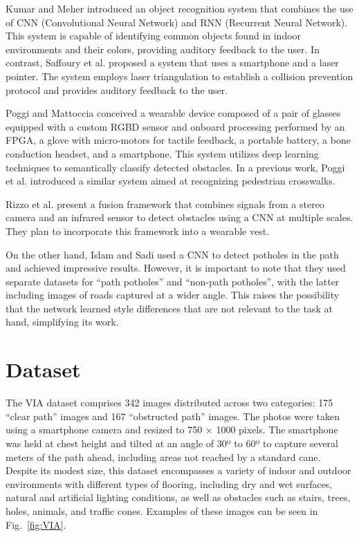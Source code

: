 \documentclass[final,5p,times,twocolumn]{elsarticle}
\begin{document}
Kumar and Meher \cite{kumar2015} introduced an object recognition system that combines the use of CNN (Convolutional Neural Network) and RNN (Recurrent Neural Network). This system is capable of identifying common objects found in indoor environments and their colors, providing auditory feedback to the user. In contrast, Saffoury et al. \cite{saffoury2016} proposed a system that uses a smartphone and a laser pointer. The system employs laser triangulation to establish a collision prevention protocol and provides auditory feedback to the user.

Poggi and Mattoccia \cite{poggi2016} conceived a wearable device composed of a pair of glasses equipped with a custom RGBD sensor and onboard processing performed by an FPGA, a glove with micro-motors for tactile feedback, a portable battery, a bone conduction headset, and a smartphone. This system utilizes deep learning techniques to semantically classify detected obstacles. In a previous work, Poggi et al. \cite{poggi2015} introduced a similar system aimed at recognizing pedestrian crosswalks.

Rizzo et al. \cite{rizzo2017} present a fusion framework that combines signals from a stereo camera and an infrared sensor to detect obstacles using a CNN at multiple scales. They plan to incorporate this framework into a wearable vest.

On the other hand, Islam and Sadi \cite{islam2018} used a CNN to detect potholes in the path and achieved impressive results. However, it is important to note that they used separate datasets for ``path potholes'' and ``non-path potholes'', with the latter including images of roads captured at a wider angle. This raises the possibility that the network learned style differences that are not relevant to the task at hand, simplifying its work.

\section{Dataset}\label{sec:dataset}

The VIA dataset \cite{breve2020} comprises 342 images distributed across two categories: 175 ``clear path'' images and 167 ``obstructed path'' images. The photos were taken using a smartphone camera and resized to 750 × 1000 pixels. The smartphone was held at chest height and tilted at an angle of 30º to 60º to capture several meters of the path ahead, including areas not reached by a standard cane. Despite its modest size, this dataset encompasses a variety of indoor and outdoor environments with different types of flooring, including dry and wet surfaces, natural and artificial lighting conditions, as well as obstacles such as stairs, trees, holes, animals, and traffic cones. Examples of these images can be seen in Fig.~\ref{fig:VIA}.
\end{document}
